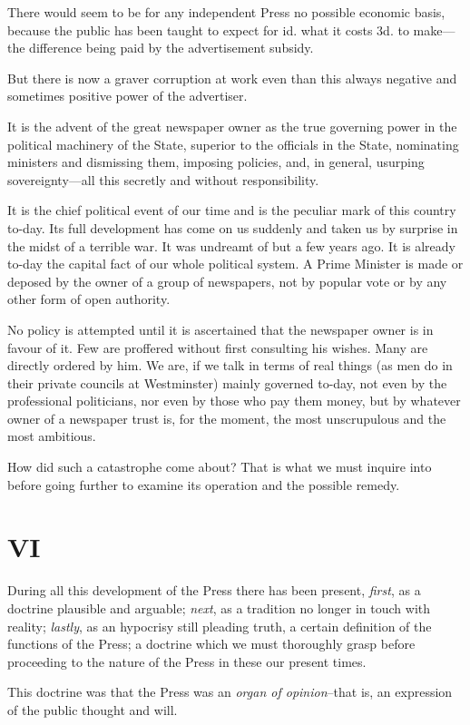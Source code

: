 \documentclass{book}
\begin{document}
There would seem to be for any independent Press no possible economic basis, because the public has been taught to expect for id. what it costs 3d. to make—the difference being paid by the advertisement subsidy.

But there is now a graver corruption at work even than this always negative and sometimes positive power of the advertiser.

It is the advent of the great newspaper owner as the true governing power in the political machinery of the State, superior to the officials in the State, nominating ministers and dismissing them, imposing policies, and, in general, usurping sovereignty—all this secretly and without responsibility.

It is the chief political event of our time and is the peculiar mark of this country to-day. Its full development has come on us suddenly and taken us by surprise in the midst of a terrible war. It was undreamt of but a few years ago. It is already to-day the capital fact of our whole political system. A Prime Minister is made or deposed by the owner of a group of newspapers, not by popular vote or by any other form of open authority.

No policy is attempted until it is ascertained that the newspaper owner is in favour of it. Few are proffered without first consulting his wishes. Many are directly ordered by him. We are, if we talk in terms of real things (as men do in their private councils at Westminster) mainly governed to-day, not even by the professional politicians, nor even by those who pay them money, but by whatever owner of a newspaper trust is, for the moment, the most unscrupulous and the most ambitious.

How did such a catastrophe come about? That is what we must inquire into before going further to examine its operation and the possible remedy.

\chapter*{VI}
\label{chapter-7}
During all this development of the Press there has been present, \emph{first}, as a doctrine plausible and arguable; \emph{next}, as a tradition no longer in touch with reality; \emph{lastly}, as an hypocrisy still pleading truth, a certain definition of the functions of the Press; a doctrine which we must thoroughly grasp before proceeding to the nature of the Press in these our present times.

This doctrine was that the Press was an \emph{organ of opinion}–that is, an expression of the public thought and will.
\end{document}
